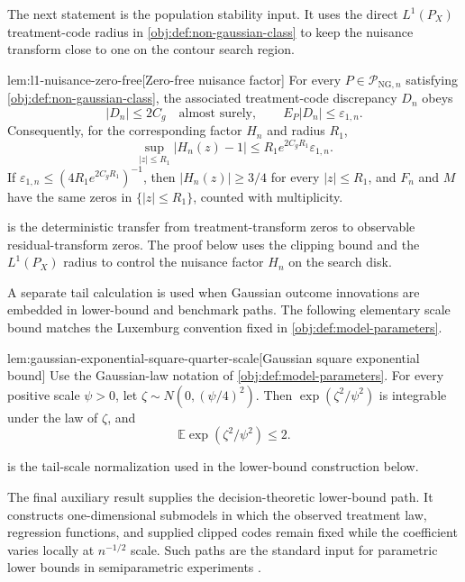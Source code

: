 The next statement is the population stability input. It uses the direct \(L^1(P_X)\) treatment-code radius in \cref{obj:def:non-gaussian-class} to keep the nuisance transform close to one on the contour search region.

\begin{lemmav}{lem:l1-nuisance-zero-free}[Zero-free nuisance factor]
For every \(P\in\mathcal P_{\mathrm{NG},n}\) satisfying \cref{obj:def:non-gaussian-class}, the associated treatment-code discrepancy \(D_n\) obeys
\[
 |D_n|\le 2C_g\quad\text{almost surely},
 \qquad
 E_P|D_n|\le \varepsilon_{1,n}.
\]
Consequently, for the corresponding factor \(H_n\) and radius \(R_1\),
\[
 \sup_{|z|\le R_1}|H_n(z)-1|
 \le R_1 e^{2C_gR_1}\varepsilon_{1,n}.
\]
If \(\varepsilon_{1,n}\le (4R_1 e^{2C_gR_1})^{-1}\), then \(|H_n(z)|\ge 3/4\) for every \(|z|\le R_1\), and \(F_n\) and \(M\) have the same zeros in \(\{|z|\le R_1\}\), counted with multiplicity.
\end{lemmav}

 is the deterministic transfer from treatment-transform zeros to observable residual-transform zeros. The proof below uses the clipping bound and the \(L^1(P_X)\) radius to control the nuisance factor \(H_n\) on the search disk.

A separate tail calculation is used when Gaussian outcome innovations are embedded in lower-bound and benchmark paths. The following elementary scale bound matches the Luxemburg convention fixed in \cref{obj:def:model-parameters}.

\begin{lemmav}{lem:gaussian-exponential-square-quarter-scale}[Gaussian square exponential bound]
Use the Gaussian-law notation of \cref{obj:def:model-parameters}. For every positive scale \(\psi>0\), let \(\zeta\sim N(0,(\psi/4)^2)\). Then \(\exp(\zeta^2/\psi^2)\) is integrable under the law of \(\zeta\), and
\[
\mathbb E\exp(\zeta^2/\psi^2)\le 2 .
\]
\end{lemmav}

 is the tail-scale normalization used in the lower-bound construction below.

The final auxiliary result supplies the decision-theoretic lower-bound path. It constructs one-dimensional submodels in which the observed treatment law, regression functions, and supplied clipped codes remain fixed while the coefficient varies locally at \(n^{-1/2}\) scale. Such paths are the standard input for parametric lower bounds in semiparametric experiments \citep{BickelKlaassenRitovWellner1993,VanDerVaart1998}.

